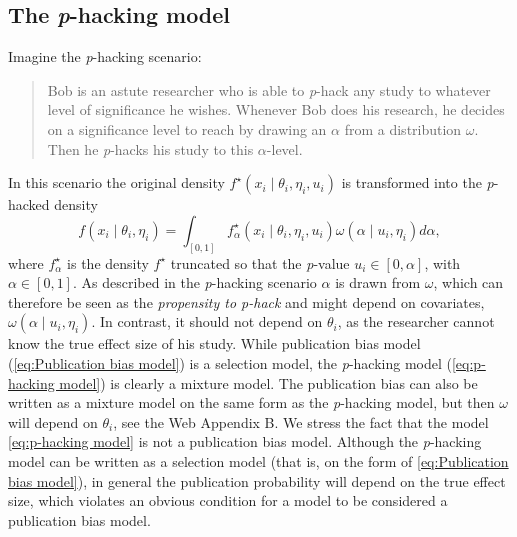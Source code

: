 \documentclass[useAMS,usenatbib,referee]{biom}
\begin{document}
\subsection{The \textit{p}-hacking model}\label{subsect:p-hacking}
Imagine the \textit{p}-hacking scenario:
\begin{quote}
Bob is an astute researcher who is able to \textit{p}-hack any study to whatever level of significance he wishes. Whenever Bob does his research, he decides on a significance level to reach by drawing an $\alpha$ from a distribution $\omega$. Then he \textit{p}-hacks his study to this $\alpha$-level.
\end{quote}
In this scenario the original density $f^{\star}(x_{i}\mid\theta_{i},\eta_{i}, u_i)$
is transformed into the \textit{p}-hacked density
\begin{equation}\label{eq:p-hacking model}
f(x_{i}\mid\theta_{i},\eta_{i})=\int_{[0,1]}f_\alpha^{\star}(x_{i}\mid\theta_{i},\eta_{i}, u_i)\omega(\alpha\mid u_i, \eta_i)d\alpha,
\end{equation}
where $f_\alpha^{\star}$ is the density $f^{\star}$ truncated so that the \textit{p}-value $u_i\in\left[0,\alpha\right]$, with $\alpha \in [0,1]$. As described in the \textit{p}-hacking scenario $\alpha$ is drawn from $\omega$, which can therefore be seen as the \emph{propensity to p-hack} and might depend on covariates, $\omega(\alpha \mid u_i, \eta_i)$. In contrast, it should not depend on $\theta_{i}$, as the researcher cannot know the true effect size of his study. While publication bias model (\ref{eq:Publication bias model}) is a selection model, the \textit{p}-hacking model (\ref{eq:p-hacking model}) is clearly a mixture model. The publication bias can also be written as a mixture model on the same form as the \textit{p}-hacking model, but then $\omega$ will depend on $\theta_i$, see the Web Appendix B. We stress the fact that the model \eqref{eq:p-hacking model} is not a publication bias model. Although the \textit{p}-hacking model can be written as a selection model (that is, on the form of \eqref{eq:Publication bias model}), in general the publication probability will depend on the true effect size, which violates an obvious condition for a model to be considered a publication bias model.
\end{document}
